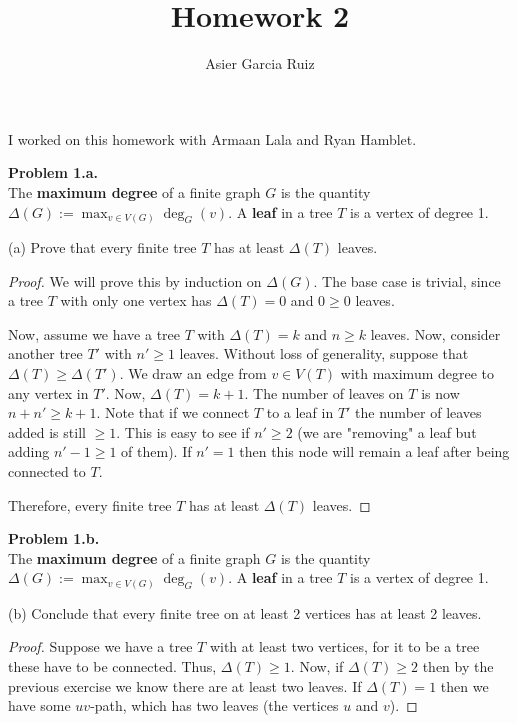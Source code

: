 \documentclass{article}
\title{Homework 2}
\author{Asier Garcia Ruiz}
\newenvironment{hwproof}[2]
{
    \textbf{Problem #1.}\\
    #2
    \begin{proof}
}{
    \end{proof}
    \newpage
}
\begin{document}
\maketitle

I worked on this homework with Armaan Lala and Ryan Hamblet.

\begin{hwproof}
    {1.a}
    {
        The \textbf{maximum degree} of a finite graph $G$ is the quantity
        $\Delta(G) := \max_{v\in V(G)}\deg_G(v)$. A \textbf{leaf} in a tree $T$
        is a vertex of degree 1.

        (a) Prove that every finite tree $T$ has at least $\Delta(T)$ leaves.
    }
    We will prove this by induction on $\Delta(G)$. The base case is trivial,
    since a tree $T$ with only one vertex has $\Delta(T) = 0$ and $0 \geq 0$ leaves.

    Now, assume we have a tree $T$ with $\Delta(T) = k$ and $n \geq k$ leaves. Now, consider
    another tree $T'$ with $n' \geq 1$ leaves. Without loss of generality,
    suppose that $\Delta(T) \geq \Delta(T')$. We draw an edge from $v \in V(T)$ with
    maximum degree to any vertex in $T'$. Now, $\Delta(T) = k + 1$. The number of
    leaves on $T$ is now $n + n' \geq k + 1$. Note that if we connect $T$ to a leaf
    in $T'$ the number of leaves added is still $\geq 1$. This is easy to see if
    $n' \geq 2$ (we are "removing" a leaf but adding $n' - 1 \geq 1$ of them).
    If $n' = 1$ then this node will remain a leaf after being connected to $T$.

    Therefore, every finite tree $T$ has at least $\Delta(T)$ leaves.
\end{hwproof}

\begin{hwproof}
    {1.b}
    {
        The \textbf{maximum degree} of a finite graph $G$ is the quantity
        $\Delta(G) := \max_{v\in V(G)}\deg_G(v)$. A \textbf{leaf} in a tree $T$
        is a vertex of degree 1.

        (b) Conclude that every finite tree on at least 2 vertices has at least
        2 leaves.
    }
    Suppose we have a tree $T$ with at least two vertices, for it to be a tree
    these have to be connected. Thus, $\Delta(T) \geq 1$. Now, if
    $\Delta(T) \geq 2$ then by the previous exercise we know there are at least
    two leaves. If $\Delta(T) = 1$ then we have some $uv$-path, which has two leaves
    (the vertices $u$ and $v$).
\end{hwproof}
\end{document}
